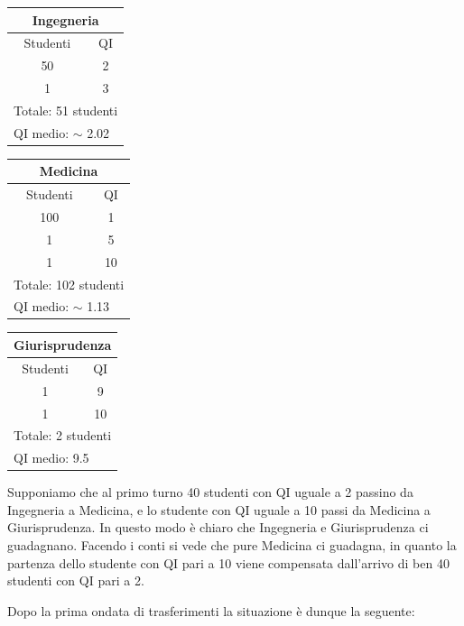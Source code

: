 {\hfill
{\renewcommand{\arraystretch}{1.3}
\begin{tabular}{|c|c|}
    \hline
    \multicolumn{2}{|c|}{\textbf{Ingegneria}}  \\
    \hline
    Studenti & QI  \\
    \hline\hline
    50 & 2  \\
    \hline
    1 & 3  \\
    \hline\hline
    \multicolumn{2}{|l|}{Totale: 51 studenti}  \\
    \multicolumn{2}{|l|}{QI medio: $\sim$ 2.02}  \\
    \hline
\end{tabular}
\hfill
\begin{tabular}{|c|c|}
    \hline
    \multicolumn{2}{|c|}{\textbf{Medicina}}  \\
    \hline
    Studenti & QI  \\
    \hline\hline
    100 & 1  \\
    \hline
    1 & 5  \\
    \hline
    1 & 10  \\
    \hline\hline
    \multicolumn{2}{|l|}{Totale: 102 studenti}  \\
    \multicolumn{2}{|l|}{QI medio: $\sim$ 1.13}  \\
    \hline
\end{tabular}
\hfill
\begin{tabular}{|c|c|}
    \hline
    \multicolumn{2}{|c|}{\textbf{Giurisprudenza}}  \\
    \hline
    Studenti & QI  \\
    \hline\hline
    1 & 9  \\
    \hline
    1 & 10  \\
    \hline\hline
    \multicolumn{2}{|l|}{Totale: 2 studenti}  \\
    \multicolumn{2}{|l|}{QI medio: 9.5}  \\
    \hline
\end{tabular}
}
\hfill\mbox{}
\medskip

Supponiamo che al primo turno 40 studenti con QI uguale a 2 passino da Ingegneria a Medicina, e lo studente con QI uguale a 10 passi da Medicina a Giurisprudenza.  In questo modo è chiaro che Ingegneria e Giurisprudenza ci guadagnano. Facendo i conti si vede che pure Medicina ci guadagna, in quanto la partenza dello studente con QI pari a 10 viene compensata dall'arrivo di ben 40 studenti con QI pari a 2.

Dopo la prima ondata di trasferimenti la situazione è dunque la
seguente:\medskip

}
